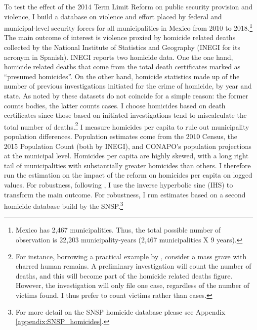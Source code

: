\documentclass[12pt]{amsart}
\makeatletter
\def\section{\@startsection{section}{1}
	\z@{1.0\linespacing\@plus\linespacing}{.5\linespacing}{\Large}}
\numberwithin{equation}{section}
\theoremstyle{definition}
\theoremstyle{definition}
\theoremstyle{definition}
\makeatother
\begin{document}
\section{Data \label{sec:data}}  

To test the effect of the 2014 Term Limit Reform on public security provision and violence, I build a database on violence and effort placed by federal and municipal-level security forces for all municipalities in Mexico from 2010 to 2018.\footnote{Mexico has 2,467 municipalities. Thus, the total possible number of observation is 22,203 municipality-years (2,467 municipalities X 9 years).} The main outcome of interest is violence proxied by homicide related deaths collected by the National Institute of Statistics and Geography (INEGI for its acronym in Spanish). INEGI reports two homicide data. One the one hand, homicide related deaths that come from the total death certificates marked as ``presumed homicides''. On the other hand, homicide statistics made up of the number of previous investigations initiated for the crime of homicide, by year and state. As noted by \citet{rivera_2012} these datasets do not coincide for a simple reason: the former counts bodies, the latter counts cases. I choose homicides based on death certificates since those based on initiated investigations tend to miscalculate the total number of deaths.\footnote{For instance, borrowing a practical example by \citet{rivera_2012}, consider a mass grave with charred human remains. A preliminary investigation will count the number of deaths, and this will become part of the homicide related deaths figure. However, the investigation will only file one case, regardless of the number of victims found. I thus prefer to count victims rather than cases.} I measure homicides per capita to rule out municipality population differences. Population estimates come from the 2010 Census, the 2015 Population Count (both by INEGI), and CONAPO's population projections at the municipal level. Homicides per capita are highly skewed, with a long right tail of municipalities with substantially greater homicides than others. I therefore run the estimation on the impact of the reform on homicides per capita on logged values. For robustness, following \citet{mackinnon_maggie_1990}, I use the inverse hyperbolic sine (IHS) to transform the main outcome. For robustness, I run estimates based on a second homicide database build by the SNSP.\footnote{For more detail on the SNSP homicide database please see Appendix \ref{appendix:SNSP_homicides}.}
\end{document}
